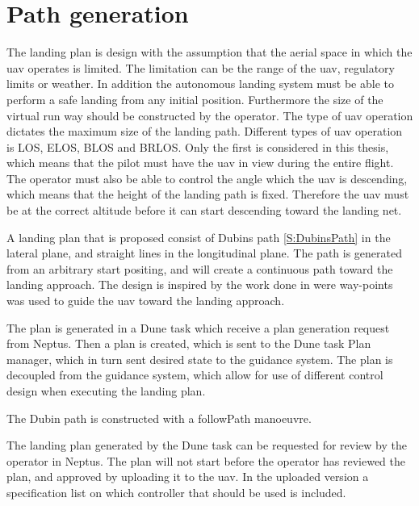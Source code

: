 \section{Path generation}
The landing plan is design with the assumption that the aerial space in which the uav operates is limited. The limitation can be the range of the uav, regulatory limits or weather. In addition the autonomous landing system must be able to perform a safe landing from any initial position. Furthermore the size of the virtual run way should be constructed by the operator. The type of uav operation dictates the maximum size of the landing path. Different types of uav operation is LOS, ELOS, BLOS and BRLOS. Only the first is considered in this thesis, which means that the pilot must have the uav in view during the entire flight. The operator must also be able to control the angle which the uav is descending, which means that the height of the landing path is fixed. Therefore the uav must be at the correct altitude before it can start descending toward the landing net.

A landing plan that is proposed consist of Dubins path \ref{S:DubinsPath} in the lateral plane, and straight lines in the longitudinal plane. The path is generated from an arbitrary start positing, and will create a continuous path toward the landing approach. The design is inspired by the work done in \citep{Skulstad&Syversen} were way-points was used to guide the uav toward the landing approach.

The plan is generated in a Dune task which receive a plan generation request from Neptus. Then a plan is created, which is sent to the Dune task Plan manager, which in turn sent desired state to the guidance system. The plan is decoupled from the guidance system, which allow for use of different control design when executing the landing plan.

The Dubin path is constructed with a followPath manoeuvre.

The landing plan generated by the Dune task can be requested for review by the operator in Neptus. The plan will not start before the operator has reviewed the plan, and approved by uploading it to the uav. In the uploaded version a specification list on which controller that should be used is included.  
